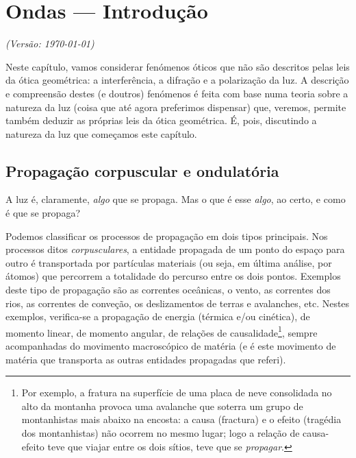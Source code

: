 \chapter{Ondas --- Introdução}
\textsl{{\sffamily(Versão: \today)}}

\noindent
Neste capítulo, vamos considerar fenómenos óticos que não são descritos pelas
leis da ótica geométrica: a interferência, a difração e a polarização da luz.
A descrição e compreensão destes (e doutros) fenómenos é feita com base numa
teoria sobre a natureza da luz (coisa que até agora preferimos dispensar)
que, veremos, permite também deduzir as próprias leis da ótica geométrica. É,
pois, discutindo a natureza da luz que começamos este capítulo.

\section{Propagação corpuscular e ondulatória}
A luz é, claramente, \emph{algo} que se propaga. Mas o que é esse \emph{algo},
ao certo, e como é que se propaga?

Podemos classificar os processos de propagação em dois tipos principais. Nos
processos ditos \emph{corpusculares}, a entidade propagada de um ponto do espaço
para outro é transportada por partículas materiais (ou seja, em última análise,
por átomos) que percorrem a totalidade do percurso entre os dois pontos.
Exemplos deste tipo de propagação são as correntes oceânicas, o vento, as
correntes dos rios, as correntes de conveção, os deslizamentos de terras e
avalanches, etc. Nestes exemplos, verifica-se a propagação de energia (térmica
e/ou cinética), de momento linear, de momento angular, de relações de
causalidade\footnote{Por exemplo, a fratura na superfície de uma placa de neve
consolidada no alto da montanha provoca uma avalanche que soterra um grupo de
montanhistas mais abaixo na encosta: a causa (fractura) e o efeito (tragédia dos
montanhistas) não ocorrem no mesmo lugar; logo a relação de causa-efeito teve
que viajar entre os dois sítios, teve que se \emph{propagar}.}, sempre
acompanhadas do movimento macroscópico de matéria (e é este movimento de matéria
que transporta as outras entidades propagadas que referi).

